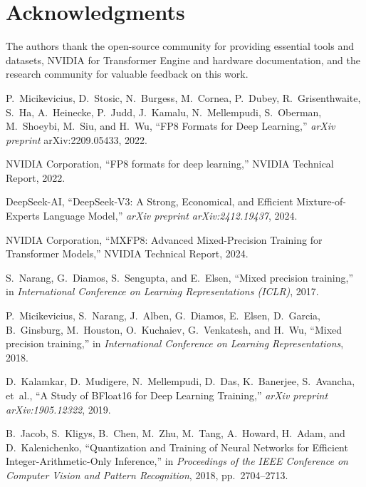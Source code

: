 \documentclass[conference]{IEEEtran}
\begin{document}
\section*{Acknowledgments}

The authors thank the open-source community for providing essential tools and datasets, NVIDIA for Transformer Engine and hardware documentation, and the research community for valuable feedback on this work.

\begin{thebibliography}{40}

P.~Micikevicius, D.~Stosic, N.~Burgess, M.~Cornea, P.~Dubey, R.~Grisenthwaite, 
S.~Ha, A.~Heinecke, P.~Judd, J.~Kamalu, N.~Mellempudi, S.~Oberman, 
M.~Shoeybi, M.~Siu, and H.~Wu, 
``FP8 Formats for Deep Learning,'' 
\emph{arXiv preprint} arXiv:2209.05433, 2022.

NVIDIA Corporation,
``FP8 formats for deep learning,''
NVIDIA Technical Report, 2022.

DeepSeek-AI,
``DeepSeek-V3: A Strong, Economical, and Efficient Mixture-of-Experts Language Model,''
\emph{arXiv preprint arXiv:2412.19437}, 2024.

NVIDIA Corporation,
``MXFP8: Advanced Mixed-Precision Training for Transformer Models,''
NVIDIA Technical Report, 2024.

S.~Narang, G.~Diamos, S.~Sengupta, and E.~Elsen,
``Mixed precision training,''
in \emph{International Conference on Learning Representations (ICLR)}, 2017.

P.~Micikevicius, S.~Narang, J.~Alben, G.~Diamos, E.~Elsen, D.~Garcia, B.~Ginsburg, M.~Houston, O.~Kuchaiev, G.~Venkatesh, and H.~Wu,
``Mixed precision training,''
in \emph{International Conference on Learning Representations}, 2018.

D.~Kalamkar, D.~Mudigere, N.~Mellempudi, D.~Das, K.~Banerjee, S.~Avancha, et~al.,
``A Study of BFloat16 for Deep Learning Training,''
\emph{arXiv preprint arXiv:1905.12322}, 2019.

B.~Jacob, S.~Kligys, B.~Chen, M.~Zhu, M.~Tang, A.~Howard, H.~Adam, and D.~Kalenichenko,
``Quantization and Training of Neural Networks for Efficient Integer-Arithmetic-Only Inference,''
in \emph{Proceedings of the IEEE Conference on Computer Vision and Pattern Recognition}, 2018, pp.~2704--2713.


\end{thebibliography}
\end{document}
